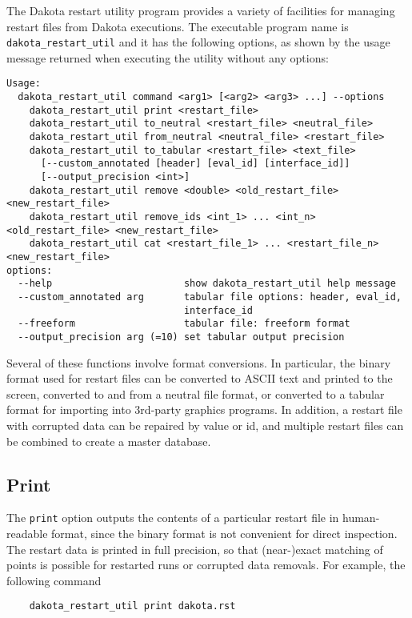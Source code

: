 The Dakota restart utility program provides a variety of facilities
for managing restart files from Dakota executions. The executable
program name is \texttt{dakota\_restart\_util} and it has the
following options, as shown by the usage message returned when
executing the utility without any options:
\begin{footnotesize}
\begin{verbatim}
Usage:
  dakota_restart_util command <arg1> [<arg2> <arg3> ...] --options
    dakota_restart_util print <restart_file>
    dakota_restart_util to_neutral <restart_file> <neutral_file>
    dakota_restart_util from_neutral <neutral_file> <restart_file>
    dakota_restart_util to_tabular <restart_file> <text_file>
      [--custom_annotated [header] [eval_id] [interface_id]]
      [--output_precision <int>]
    dakota_restart_util remove <double> <old_restart_file> <new_restart_file>
    dakota_restart_util remove_ids <int_1> ... <int_n> <old_restart_file> <new_restart_file>
    dakota_restart_util cat <restart_file_1> ... <restart_file_n> <new_restart_file>
options:
  --help                       show dakota_restart_util help message
  --custom_annotated arg       tabular file options: header, eval_id, 
                               interface_id
  --freeform                   tabular file: freeform format
  --output_precision arg (=10) set tabular output precision
\end{verbatim}
\end{footnotesize}

Several of these functions involve format conversions. In particular,
the binary format used for restart files can be converted to ASCII
text and printed to the screen, converted to and from a neutral file
format, or converted to a tabular format for importing into 3rd-party
graphics programs. In addition, a restart file with corrupted data can
be repaired by value or id, and multiple restart files can be combined
to create a master database.

\subsection{Print}\label{restart:utility:print}

The \texttt{print} option outputs the contents of a particular restart
file in human-readable format, since the binary format is not
convenient for direct inspection. The restart data is printed in full
precision, so that (near-)exact matching of points is possible for
restarted runs or corrupted data removals. For example, the following
command
\begin{small}
\begin{verbatim}
    dakota_restart_util print dakota.rst
\end{verbatim}
\end{small}

